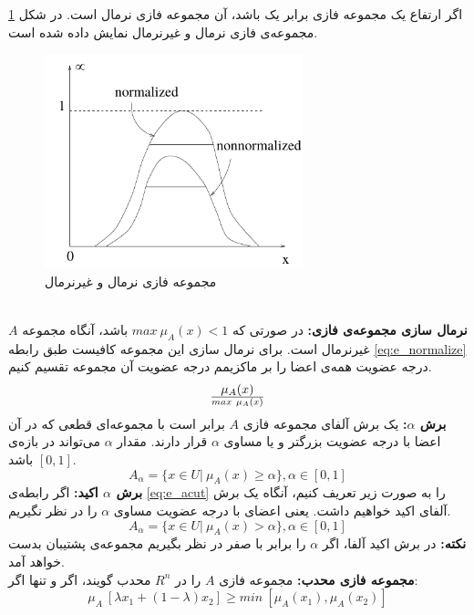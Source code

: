 \documentclass[12pt,a4paper]{article}
\theoremstyle{definition}
\begin{document}
اگر ارتفاع یک مجموعه فازی برابر یک باشد، آن مجموعه فازی نرمال است. در شکل 
\ref{fig:f_6}
مجموعه‌ی فازی نرمال و غیرنرمال نمایش داده شده است.
\begin{figure}[h]
	\centering 
	\includegraphics[width=75mm]{Images/Fig6.png}
		\vspace{-0.5cm}
	\caption{مجموعه فازی نرمال و غیرنرمال}\label{fig:f_6}
\end{figure}\\
\textbf{نرمال سازی مجموعه‌ی فازی:}
در صورتی که 
$max\ \mu_{A}(x) < 1$
باشد، آنگاه مجموعه $A$ غیرنرمال است. برای نرمال سازی این مجموعه کافیست طبق رابطه 
\ref{eq:e_normalize}
درجه عضویت همه‌ی اعضا را بر ماکزیمم درجه عضویت آن مجموعه تقسیم کنیم.
\begin{equation}\label{eq:e_normalize}
	\mu_{A}(x) \over {max\ \mu_{A}(x)}
\end{equation}
\textbf{برش $\alpha$:}
یک برش آلفای مجموعه‌ فازی $A$ برابر است با مجموعه‌ای قطعی که در آن اعضا با درجه عضویت بزرگتر و یا مساوی $\alpha$ قرار دارند. مقدار $\alpha$ می‌تواند در بازه‌ی 
$[0,1]$
باشد. 
\begin{equation}\label{eq:e_acut}
	A_{\alpha}=\{ x \in U |\ \mu_{A}(x) \ge \alpha \}, \alpha \in [0,1]
\end{equation}
\textbf{برش $\alpha$ اکید:}
اگر رابطه‌ی 
\ref{eq:e_acut}
را به صورت زیر تعریف کنیم، آنگاه یک برش آلفای اکید خواهیم داشت. یعنی اعضای با درجه عضویت مساوی $\alpha$ را در نظر نگیریم.
\begin{equation}\label{eq:e_acuta}
A_{\alpha}=\{ x \in U |\ \mu_{A}(x) > \alpha \}, \alpha \in [0,1]
\end{equation}
\textbf{نکته:}
در برش اکید آلفا، اگر $\alpha$ را برابر با صفر در نظر بگیریم مجموعه‌ی پشتیبان بدست خواهد آمد.\\
\textbf{مجموعه فازی محدب:}
مجموعه فازی $A$ را در $R^n$ محدب گویند، اگر و تنها اگر:
\begin{equation}\label{eq:e_covset}
\mu_A\ [\lambda x_1+(1-\lambda)x_2] \ge min\ [ \mu_{A}(x_1), \mu_{A}(x_2) ]
\end{equation} 
\end{document}
